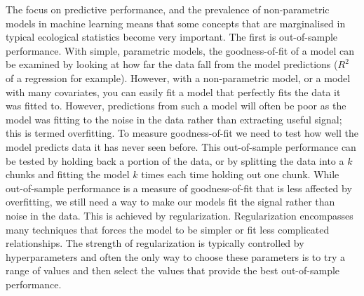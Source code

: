 \documentclass[12pt,]{article}
\begin{document}
The focus on predictive performance, and the prevalence of non-parametric models in machine learning means that some concepts that are marginalised in typical ecological statistics become very important.
The first is out-of-sample performance.
With simple, parametric models, the goodness-of-fit of a model can be examined by looking at how far the data fall from the model predictions ($R^2$ of a regression for example).
However, with a non-parametric model, or a model with many covariates, you can easily fit a model that perfectly fits the data it was fitted to.
However, predictions from such a model will often be poor as the model was fitting to the noise in the data rather than extracting useful signal; this is termed overfitting.
To measure goodness-of-fit we need to test how well the model predicts data it has never seen before.
This out-of-sample performance can be tested by holding back a portion of the data, or by splitting the data into a $k$ chunks and fitting the model $k$ times each time holding out one chunk.
While out-of-sample performance is a measure of goodness-of-fit that is less affected by overfitting, we still need a way to make our models fit the signal rather than noise in the data.
This is achieved by regularization.
Regularization encompasses many techniques that forces the model to be simpler or fit less complicated relationships.
The strength of regularization is typically controlled by hyperparameters and often the only way to choose these parameters is to try a range of values and then select the values that provide the best out-of-sample performance.
\end{document}
